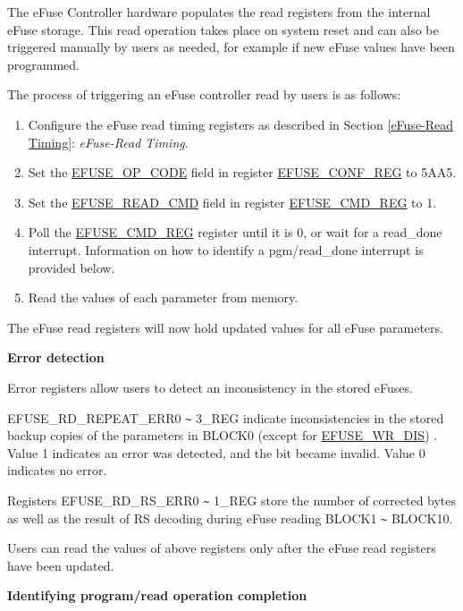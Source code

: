 \documentclass[main\_\_EN.tex]{subfiles}
\begin{document}
The eFuse Controller hardware populates the read registers from the internal eFuse storage. This read operation takes place on system reset and can also be triggered manually by users as needed, for example if new eFuse values have been programmed.

The process of triggering an eFuse controller read by users is as follows:

\begin{enumerate}
    \item Configure the eFuse read timing registers as described in Section \ref{eFuse-Read Timing}: \textit{eFuse-Read Timing}.
    \item Set the \hyperref[fielddesc:EFUSEOPCODE]{EFUSE\_OP\_CODE} field in register \hyperref[regdesc:EFUSECONFREG]{EFUSE\_CONF\_REG} to \hexprefix{}5AA5.
    \item Set the \hyperref[fielddesc:EFUSEREADCMD]{EFUSE\_READ\_CMD} field in register \hyperref[regdesc:EFUSECMDREG]{EFUSE\_CMD\_REG} to 1.
    \item Poll the \hyperref[regdesc:EFUSECMDREG]{EFUSE\_CMD\_REG} register until it is \hexprefix{}0, or wait for a read\_done interrupt. Information on how to identify a pgm/read\_done interrupt is provided below.
    \item Read the values of each parameter from memory.
\end{enumerate}
The eFuse read registers will now hold updated values for all eFuse parameters.

{\bfseries Error detection}

Error registers allow users to detect an inconsistency in the stored eFuses.

EFUSE\_RD\_REPEAT\_ERR0 \verb+~+ 3\_REG indicate inconsistencies in the stored backup copies of the parameters in BLOCK0 (except for \hyperref[fielddesc:EFUSEWRDIS]{EFUSE\_WR\_DIS}) . Value 1 indicates an error was detected, and the bit became invalid. Value 0 indicates no error.

Registers EFUSE\_RD\_RS\_ERR0 \verb+~+ 1\_REG store the number of corrected bytes as well as the result of RS decoding during eFuse reading BLOCK1 \verb+~+ BLOCK10.

Users can read the values of above registers only after the eFuse read registers have been updated.

{\bfseries Identifying program/read operation completion}\label{tip:program and read done interrupt}
\end{document}
